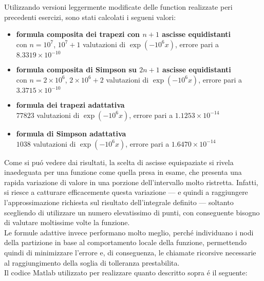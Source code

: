 \begin{center}
\footnotesize\noindent{}
\end{center}

\noindent Utilizzando versioni leggermente modificate delle function realizzate peri precedenti esercizi, sono stati calcolati i segueni valori:

\begin{itemize}

  \item \textbf{formula composita dei trapezi con \(n+1\) ascisse equidistanti} \\ con \(n = 10^7\), \(10^7 + 1\) valutazioni di \(\exp(-10^6 x)\), errore pari a \(8.3319 \times 10^{-10}\)
  \item \textbf{formula composita di Simpson su \(2n+1\) ascisse equidistanti } \\ con \(n = 2 \times 10^6\), \(2 \times 10^6 + 2\) valutazioni di \(\exp(-10^6 x)\), errore pari a \(3.3715 \times 10^{-10}\)
  \item \textbf{formula dei trapezi adattativa} \\ \(77823\) valutazioni di \(\exp(-10^6 x)\), errore pari a \(1.1253 \times 10^{-14}\)
  \item \textbf{formula di Simpson adattativa} \\ \(1038\) valutazioni di \(\exp(-10^6 x)\), errore pari a \(1.6470 \times 10^{-14}\)

\end{itemize}

\noindent Come si pu\'o vedere dai risultati, la scelta di ascisse equispaziate si rivela inaedeguata per una funzione come quella presa in esame, che presenta una rapida variazione di valore in una porzione dell'intervallo molto ristretta. Infatti, si riesce a catturare efficacemente questa variazione --- e quindi a raggiungere l'approssimazione richiesta sul risultato dell'integrale definito --- soltanto scegliendo di utilizzare un numero elevatissimo di punti, con conseguente bisogno di valutare moltissime volte la funzione.\\

\noindent Le formule adattive invece performano molto meglio, perch\'e individuano i nodi della partizione in base al comportamento locale della funzione, permettendo quindi di minimizzare l'errore e, di conseguenza, le chiamate ricorsive necessarie al raggiungimento della soglia di tolleranza prestabilita.\\

\noindent Il codice Matlab utilizzato per realizzare quanto descritto sopra \'e il seguente: \\


